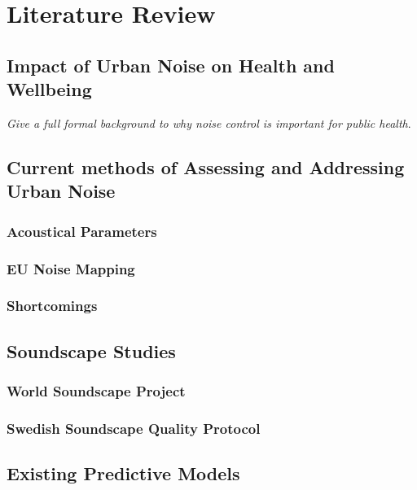 \chapter{Literature Review}
\label{ch:lit}

\section{Impact of Urban Noise on Health and Wellbeing}

\emph{Give a full formal background to why noise control is important for public health}.

\section{Current methods of Assessing and Addressing Urban Noise}

\subsection{Acoustical Parameters}

\subsection{EU Noise Mapping}

\subsection{Shortcomings}

\section{Soundscape Studies}

\subsection{World Soundscape Project}

\subsection{Swedish Soundscape Quality Protocol}

\section{Existing Predictive Models}

\cite{Lionello2020}

